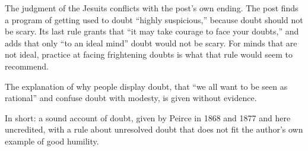 \begin{afterword}
The judgment of the Jesuits conflicts with the post's own ending. The post finds a program of getting used to doubt ``highly suspicious,'' because doubt should not be scary. Its last rule grants that ``it may take courage to face your doubts,'' and adds that only ``to an ideal mind'' doubt would not be scary. For minds that are not ideal, practice at facing frightening doubts is what that rule would seem to recommend.

The explanation of why people display doubt, that ``we all want to be seen as rational'' and confuse doubt with modesty, is given without evidence.

In short: a sound account of doubt, given by Peirce in 1868 and 1877 and here uncredited, with a rule about unresolved doubt that does not fit the author's own example of good humility.
\end{afterword}
